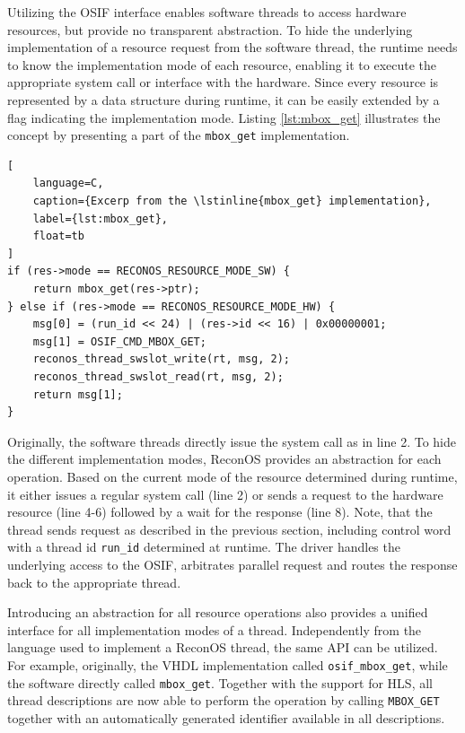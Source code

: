 Utilizing the \ac{OSIF} interface enables software threads to access hardware
resources, but provide no transparent abstraction. To hide the underlying
implementation of a resource request from the software thread, the runtime
needs to know the implementation mode of each resource, enabling it to execute
the appropriate system call or interface with the hardware. Since every
resource is represented by a data structure during runtime, it can be easily
extended by a flag indicating the implementation mode. Listing
\ref{lst:mbox_get} illustrates the concept by presenting a part of the
\lstinline{mbox_get} implementation.
\begin{lstlisting}[
	language=C,
	caption={Excerp from the \lstinline{mbox_get} implementation},
	label={lst:mbox_get},
	float=tb
]
if (res->mode == RECONOS_RESOURCE_MODE_SW) {
	return mbox_get(res->ptr);
} else if (res->mode == RECONOS_RESOURCE_MODE_HW) {
	msg[0] = (run_id << 24) | (res->id << 16) | 0x00000001;
	msg[1] = OSIF_CMD_MBOX_GET;
	reconos_thread_swslot_write(rt, msg, 2);
	reconos_thread_swslot_read(rt, msg, 2);
	return msg[1];
}
\end{lstlisting}
Originally, the software threads directly issue the system call as in line 2.
To hide the different implementation modes, ReconOS provides an abstraction
for each operation. Based on the current mode of the resource determined
during runtime, it either issues a regular system call (line 2) or sends a
request to the hardware resource (line 4-6) followed by a wait for the
response (line 8). Note, that the thread sends request as described in the
previous section, including control word with a thread id \lstinline{run_id}
determined at runtime. The driver handles the underlying access to the
\ac{OSIF}, arbitrates parallel request and routes the response back to the
appropriate thread.

Introducing an abstraction for all resource operations also provides a unified
interface for all implementation modes of a thread. Independently from the
language used to implement a ReconOS thread, the same \ac{API} can be
utilized. For example, originally, the \ac{VHDL} implementation called
\lstinline{osif_mbox_get}, while the software directly called
\lstinline{mbox_get}. Together with the support for \ac{HLS}, all thread
descriptions are now able to perform the operation by calling
\lstinline{MBOX_GET} together with an automatically generated identifier
available in all descriptions.

